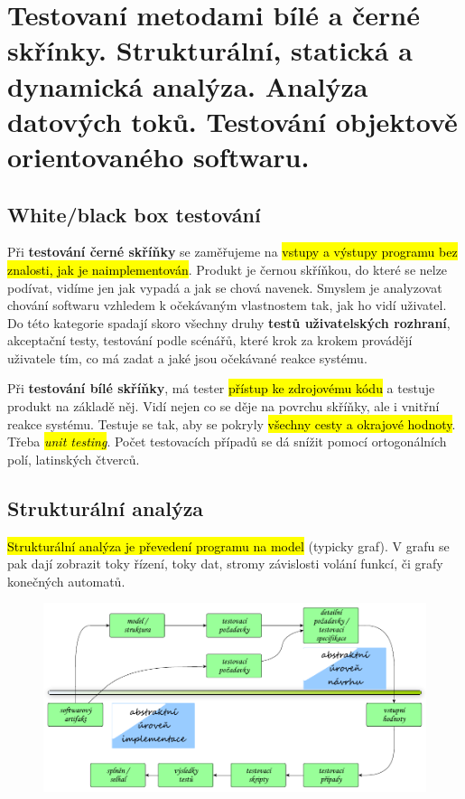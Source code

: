 \section[TVS]{Testovaní metodami bílé a černé skřínky. Strukturální, statická a dynamická analýza. Analýza datových toků. Testování objektově orientovaného softwaru.}

\subsection{White/black box testování}

Při \textbf{testování černé skříňky} se zaměřujeme na \hl{vstupy a výstupy programu bez znalosti, jak je naimplementován}. Produkt je černou skříňkou, do které se nelze podívat, vidíme jen jak vypadá a jak se chová navenek. Smyslem je analyzovat chování softwaru vzhledem k očekávaným vlastnostem tak, jak ho vidí uživatel. Do této kategorie spadají skoro všechny druhy \textbf{testů uživatelských rozhraní}, akceptační testy, testování podle scénářů, které krok za krokem provádějí uživatele tím, co má zadat a jaké jsou očekávané reakce systému.

Při \textbf{testování bílé skříňky}, má tester \hl{přístup ke zdrojovému kódu} a testuje produkt na základě něj. Vidí nejen co se děje na povrchu skříňky, ale i vnitřní reakce systému. Testuje se tak, aby se pokryly \hl{všechny cesty a okrajové hodnoty}. Třeba \hl{\textit{unit testing}}. Počet testovacích případů se dá snížit pomocí ortogonálních polí, latinských čtverců.

\subsection{Strukturální analýza}

\hl{Strukturální analýza je převedení programu na model} (typicky graf). V grafu se pak dají zobrazit toky řízení, toky dat, stromy závislosti volání funkcí, či grafy konečných automatů.

\begin{figure}[h!]
\centering
\includegraphics[width=130mm]{14/images/test-model}
\end{figure}

